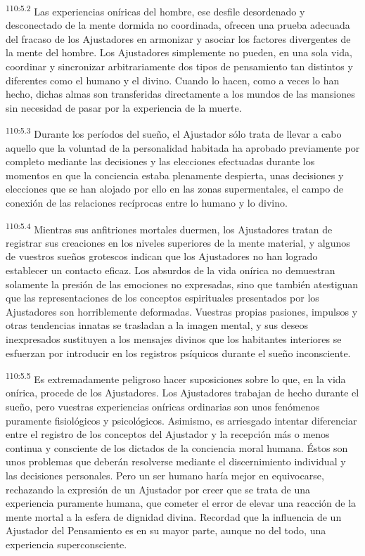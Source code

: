\documentclass[twoside, 11pt]{book}
\begin{document}
\par
\textsuperscript{110:5.2} Las experiencias oníricas del hombre, ese desfile desordenado y desconectado de la mente dormida no coordinada, ofrecen una prueba adecuada del fracaso de los Ajustadores en armonizar y asociar los factores divergentes de la mente del hombre. Los Ajustadores simplemente no pueden, en una sola vida, coordinar y sincronizar arbitrariamente dos tipos de pensamiento tan distintos y diferentes como el humano y el divino. Cuando lo hacen, como a veces lo han hecho, dichas almas son transferidas directamente a los mundos de las mansiones sin necesidad de pasar por la experiencia de la muerte.

\par
\textsuperscript{110:5.3} Durante los períodos del sueño, el Ajustador sólo trata de llevar a cabo aquello que la voluntad de la personalidad habitada ha aprobado previamente por completo mediante las decisiones y las elecciones efectuadas durante los momentos en que la conciencia estaba plenamente despierta, unas decisiones y elecciones que se han alojado por ello en las zonas supermentales, el campo de conexión de las relaciones recíprocas entre lo humano y lo divino.

\par
\textsuperscript{110:5.4} Mientras sus anfitriones mortales duermen, los Ajustadores tratan de registrar sus creaciones en los niveles superiores de la mente material, y algunos de vuestros sueños grotescos indican que los Ajustadores no han logrado establecer un contacto eficaz. Los absurdos de la vida onírica no demuestran solamente la presión de las emociones no expresadas, sino que también atestiguan que las representaciones de los conceptos espirituales presentados por los Ajustadores son horriblemente deformadas. Vuestras propias pasiones, impulsos y otras tendencias innatas se trasladan a la imagen mental, y sus deseos inexpresados sustituyen a los mensajes divinos que los habitantes interiores se esfuerzan por introducir en los registros psíquicos durante el sueño inconsciente.

\par
\textsuperscript{110:5.5} Es extremadamente peligroso hacer suposiciones sobre lo que, en la vida onírica, procede de los Ajustadores. Los Ajustadores trabajan de hecho durante el sueño, pero vuestras experiencias oníricas ordinarias son unos fenómenos puramente fisiológicos y psicológicos. Asimismo, es arriesgado intentar diferenciar entre el registro de los conceptos del Ajustador y la recepción más o menos continua y consciente de los dictados de la conciencia moral humana. Éstos son unos problemas que deberán resolverse mediante el discernimiento individual y las decisiones personales. Pero un ser humano haría mejor en equivocarse, rechazando la expresión de un Ajustador por creer que se trata de una experiencia puramente humana, que cometer el error de elevar una reacción de la mente mortal a la esfera de dignidad divina. Recordad que la influencia de un Ajustador del Pensamiento es en su mayor parte, aunque no del todo, una experiencia superconsciente.
\end{document}
